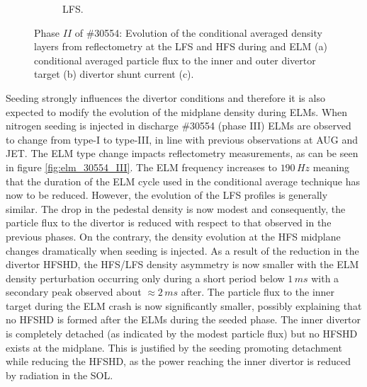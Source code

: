 \documentclass[12pt]{iopart}
\begin{document}
\begin{figure}[!hbt]
\begin{subfigure}{3in}
    \label{fig:elm_30554_LFS_II}
	\caption{LFS.}
	\end{subfigure}
	\caption{Phase $II$ of \#30554: Evolution of the conditional averaged density layers from reflectometry at the LFS and HFS during and ELM (a) conditional averaged particle flux to the inner and outer divertor target (b) divertor shunt current (c).}
	\label{fig:elm_30554_II}
\end{figure}

Seeding strongly influences the divertor conditions and therefore it is also expected to modify the evolution of the midplane density during ELMs. When nitrogen seeding is injected in discharge \#30554 (phase III) ELMs are observed to change from type-I to type-III, in line with previous observations at AUG\cite{schneider2014pedestal} and JET\cite{bernert2017power}. The ELM type change impacts reflectometry measurements, as can be seen in figure \ref{fig:elm_30554_III}. The ELM frequency increases to $190\,Hz$ meaning that the duration of the ELM cycle used in the conditional average technique has now to be reduced. However, the evolution of the LFS profiles is generally similar. The drop in the pedestal density is now modest and consequently, the particle flux to the divertor is reduced with respect to that observed in the previous phases. On the contrary, the density evolution at the HFS midplane changes dramatically when seeding is injected. As a result of the reduction in the divertor HFSHD, the HFS/LFS density asymmetry is now smaller with the ELM density perturbation occurring only during a short period below $1\,ms$ with a secondary peak observed about $\approx 2\,ms$ after. The particle flux to the inner target during the ELM crash is now significantly smaller, possibly explaining that no HFSHD is formed after the ELMs during the seeded phase. The inner divertor is completely detached (as indicated by the modest particle flux) but no HFSHD exists at the midplane. This is justified by the seeding promoting detachment while reducing the HFSHD, as the power reaching the inner divertor is reduced by radiation in the SOL.
\end{document}
